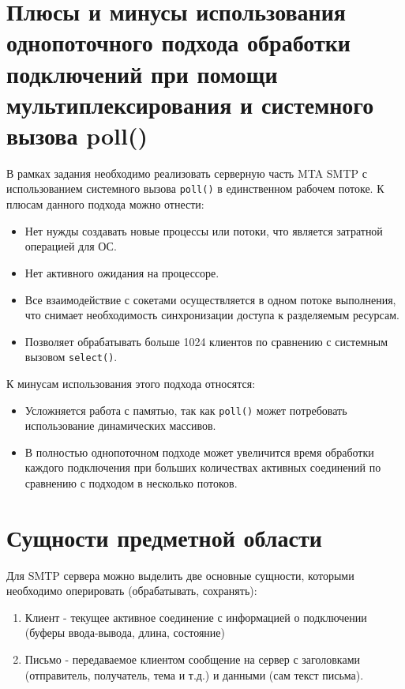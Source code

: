 \documentclass[a4paper,12pt]{report}
\begin{document}
\section{Плюсы и минусы использования однопоточного подхода обработки подключений при помощи мультиплексирования и системного вызова poll()}

В рамках задания необходимо реализовать серверную часть MTA SMTP с использованием системного вызова \texttt{poll()} в единственном рабочем потоке. К плюсам данного подхода можно отнести:
\begin{itemize}
    \item Нет нужды создавать новые процессы или потоки, что является затратной операцией для ОС.
    \item Нет активного ожидания на процессоре.
    \item Все взаимодействие с сокетами осуществляется в одном потоке выполнения, что снимает необходимость синхронизации доступа к разделяемым ресурсам.
    \item Позволяет обрабатывать больше 1024 клиентов по сравнению с системным вызовом \texttt{select()}.
\end{itemize}

К минусам использования этого подхода относятся:
\begin{itemize}
    \item Усложняется работа с памятью, так как \texttt{poll()} может потребовать использование динамических массивов.
    \item В полностью однопоточном подходе может увеличится время обработки каждого подключения при больших количествах активных соединений по сравнению с подходом в несколько потоков.
\end{itemize}


\section{Сущности предметной области}

Для SMTP сервера можно выделить две основные сущности, которыми необходимо оперировать (обрабатывать, сохранять):
\begin{enumerate}
    \item Клиент - текущее активное соединение с информацией о подключении (буферы ввода-вывода, длина, состояние)
    \item Письмо - передаваемое клиентом сообщение на сервер с заголовками (отправитель, получатель, тема и т.д.) и данными (сам текст письма).
\end{enumerate}
\end{document}
